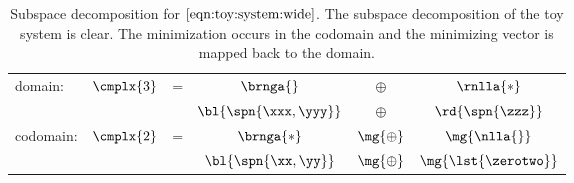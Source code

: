\begin{table}[htdp]
\caption[Subspace decomposition for equation $\eqref{eqn:toy:system:wide}$]{Subspace decomposition for $\eqref{eqn:toy:system:wide}$. The subspace decomposition of the toy system is clear. The minimization occurs in the codomain and the minimizing vector is mapped back to the domain.}
\begin{center}
\begin{tabular}{lccccc}
%
  domain: & $\cmplx{3}$ & = & $\brnga{}$ & $\oplus$ & $\rnlla{*}$ \\
  &&& ${\bl{ \spn{\xxx, \yyy} }}$ & $\oplus$ & ${\rd{ \spn{\zzz} }}$ \\[25pt]
%
  codomain: & $\cmplx{2}$ & = & $\brnga{*}$ & ${\mg{ \oplus }}$ & ${\mg{ \nlla{} }}$ \\
  &&& ${\bl{ \spn{\xx, \yy} }}$ & ${\mg{ \oplus }}$ & ${\mg{ \lst{\zerotwo} }}$ \\
%
\end{tabular}
\end{center}
\label{tab:least squares:decomposition:wide}
\end{table}


\endinput